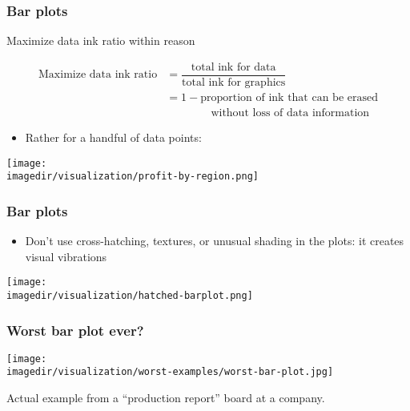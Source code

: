 \begin{frame}\frametitle{Bar plots}
	\begin{exampleblock}{Maximize data ink ratio within reason}
		\begin{center}
			\[
				\begin{array}{rl}
					\text{Maximize data ink ratio} 	&= \dfrac{\text{total ink for data}}{{\text{total ink for graphics}}} \\
													&= 1 - \text{proportion of ink that can be erased} \\
													&\qquad\qquad \text{without loss of data information} 
			\end{array}
			\]
		\end{center}
	\end{exampleblock}
	\begin{itemize}
		\item	Rather {\color{myOrange}{use a table}} for a handful of data points: 
	\end{itemize}
	\begin{center}
		\texttt{[image: \\imagedir/visualization/profit-by-region.png]}
	\end{center}
\end{frame}

\begin{frame}\frametitle{Bar plots}
	\begin{itemize}
		\item	Don't use cross-hatching, textures, or unusual shading in the plots: it creates visual vibrations 
	\end{itemize}
	\begin{center}
		\texttt{[image: \\imagedir/visualization/hatched-barplot.png]}
	\end{center}
\end{frame}

\begin{frame}\frametitle{Worst bar plot ever?}
	\begin{center}
		\texttt{[image: \\imagedir/visualization/worst-examples/worst-bar-plot.jpg]}
	\end{center}
	Actual example from a ``production report'' board at a company.
\end{frame}


